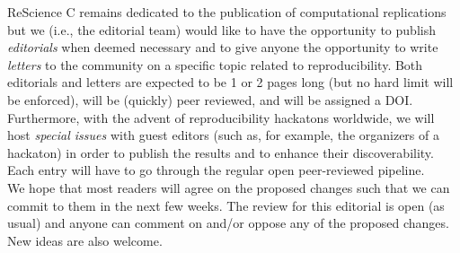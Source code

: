 ReScience C remains dedicated to the publication of computational replications
but we (i.e., the editorial team) would like to have the opportunity to
publish \emph{editorials} when deemed necessary and to give anyone the
opportunity to write \emph{letters} to the community on a specific topic
related to reproducibility. Both editorials and letters are expected to be 1 or
2 pages long (but no hard limit will be enforced), will be (quickly) peer reviewed,
and will be assigned a DOI. Furthermore, with the advent of reproducibility
hackatons worldwide, we will host {\em special issues} with guest editors (such
as, for example, the organizers of a hackaton) in order to publish the results
and to enhance their discoverability. Each entry will have to go through the
regular open peer-reviewed pipeline.\\


We hope that most readers will agree on the proposed changes such that we can
commit to them in the next few weeks. The review for this editorial is open (as
usual) and anyone can comment on and/or oppose any of the proposed changes. New
ideas are also welcome.
